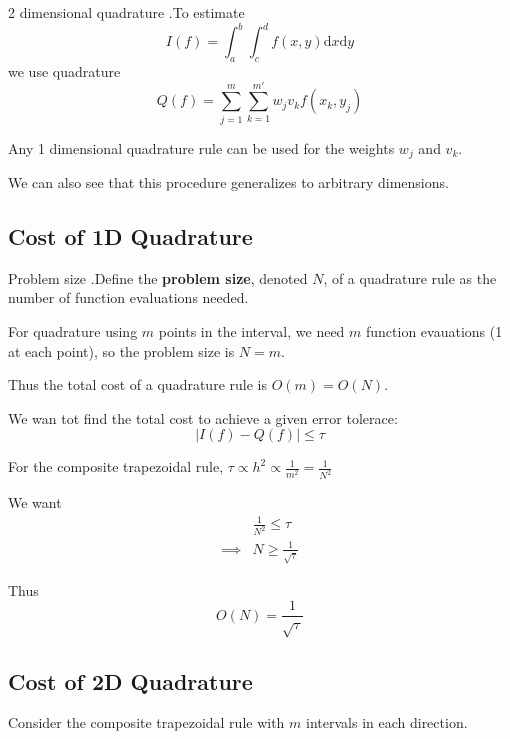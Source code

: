 \documentclass[12pt,letterpaper]{article}
\newcommand{\dd}{\mathrm{d}}
\begin{document}
\begin{defn}{2 dimensional quadrature}
.To estimate
\begin{equation}
	I(f) = \int_a^b \int_c^d f(x,y) \dd x \dd y
\end{equation}
we use quadrature
\begin{equation}
	Q(f) = \sum_{j=1}^m \sum_{k=1}^{m'} w_j v_k f(x_k, y_j)
\end{equation}
\label{def:2d_quad}
\end{defn}

Any 1 dimensional quadrature rule can be used for the weights $w_j$ and $v_k$.

We can also see that this procedure generalizes to arbitrary dimensions.

\subsection{Cost of 1D Quadrature}
\begin{defn}{Problem size}
.Define the \textbf{problem size}, denoted $N$, of a quadrature rule as the number of function evaluations needed.
\label{def:prob_size}
\end{defn}

For quadrature using $m$ points in the interval, we need $m$ function evauations (1 at each point), so the problem size is $N = m$.

Thus the total cost of a quadrature rule is $O(m) = O(N)$.

We wan tot find the total cost to achieve a given error tolerace:
\begin{equation}
	\left| I(f) - Q(f) \right| \leq \tau
\end{equation}

For the composite trapezoidal rule, $\tau \propto h^2 \propto \frac{1}{m^2} = \frac{1}{N^2}$

We want
\begin{align}
	& \frac{1}{N^2} \leq \tau \\
	\implies & N \geq \frac{1}{\sqrt{\tau}}
\end{align}

Thus
\begin{equation}
	O(N) = \frac{1}{\sqrt{\tau}}
\end{equation}

\subsection{Cost of 2D Quadrature}
Consider the composite trapezoidal rule with $m$ intervals in each direction.
\end{document}
